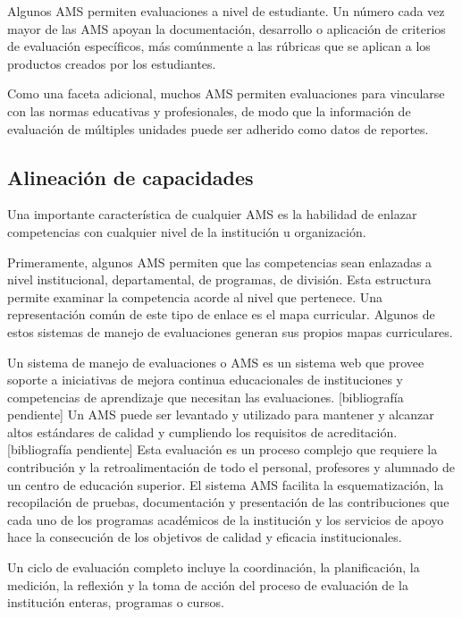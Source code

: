 Algunos AMS permiten evaluaciones a nivel de estudiante. Un número cada vez mayor de las AMS apoyan la documentación, desarrollo o aplicación de criterios de evaluación específicos, más comúnmente a las rúbricas que se aplican a los productos creados por los estudiantes.

Como una faceta adicional, muchos AMS permiten evaluaciones para vincularse con las normas educativas y profesionales, de modo que la información de evaluación de múltiples unidades puede ser adherido como datos de reportes.

\subsection{Alineación de capacidades}
Una importante característica de cualquier AMS es la habilidad de enlazar competencias con cualquier nivel de la institución u organización.

Primeramente, algunos AMS permiten que las competencias sean enlazadas a nivel institucional, departamental, de programas, de división. Esta estructura permite examinar la competencia acorde al nivel que pertenece. Una representación común de este tipo de enlace es el mapa curricular. Algunos de estos sistemas de manejo de evaluaciones generan sus propios mapas curriculares.

Un sistema de manejo de evaluaciones o AMS es un sistema web que provee soporte a iniciativas de mejora continua educacionales de instituciones y competencias de aprendizaje que necesitan las evaluaciones. [bibliografía pendiente] Un AMS puede ser levantado y utilizado para mantener y alcanzar altos estándares de calidad y cumpliendo los requisitos de acreditación. [bibliografía pendiente]
Esta evaluación es un proceso complejo que requiere la contribución y la retroalimentación de todo el personal, profesores y alumnado de un centro de educación superior. El sistema AMS facilita la esquematización, la recopilación de pruebas, documentación y presentación de las contribuciones que cada uno de los programas académicos de la institución y los servicios de apoyo hace la consecución de los objetivos de calidad y eficacia institucionales.

Un ciclo de evaluación completo incluye la coordinación, la planificación, la medición, la reflexión y la toma de acción del proceso de evaluación de la institución enteras, programas o cursos.